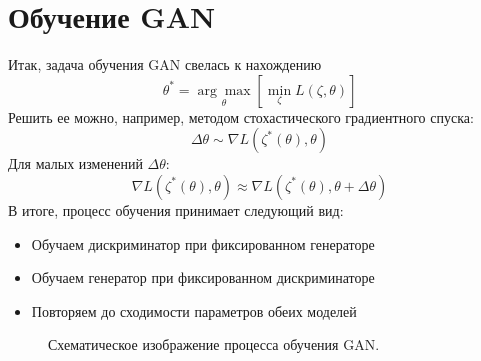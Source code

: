 \documentclass[a4paper]{article}
\begin{document}
	\section{Обучение GAN}
		Итак, задача обучения GAN свелась к нахождению
		$$ \theta^* = \underset{\theta}{\arg\max} \left[ \underset{\zeta}{\min} L(\zeta, \theta) \right] $$
		Решить ее можно, например, методом стохастического градиентного спуска:
		$$ \Delta \theta \sim \nabla L(\zeta^*(\theta), \theta)$$
		Для малых изменений $\Delta \theta$:
		$$ \nabla L(\zeta^*(\theta), \theta) \approx \nabla L(\zeta^*(\theta), \theta + \Delta \theta) $$
		В итоге, процесс обучения принимает следующий вид:
		\begin{itemize}
				\item Обучаем дискриминатор при фиксированном генераторе
				\item Обучаем генератор при фиксированном дискриминаторе
				\item Повторяем до сходимости параметров обеих моделей
		\end{itemize}
		\begin{figure}
			\caption{Схематическое изображение процесса обучения GAN.}
			\label{gan-train}
		\end{figure}
\end{document}
